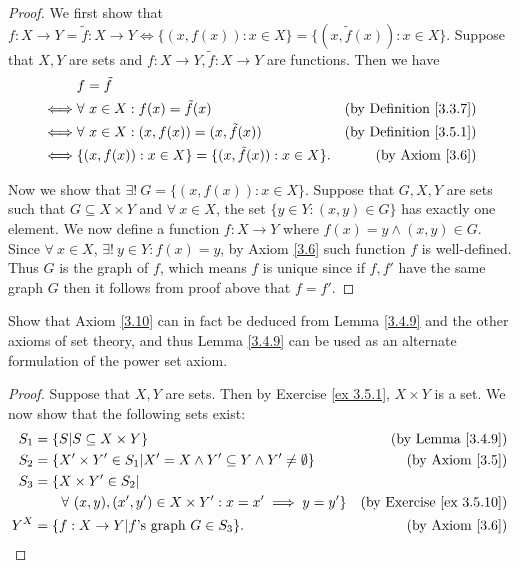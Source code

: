 \begin{proof}
    We first show that \(f : X \to Y = \tilde{f} : X \to Y \iff \{(x, f(x)) : x \in X\} = \{(x, \tilde{f}(x)) : x \in X\}\).
    Suppose that \(X, Y\) are sets and \(f : X \to Y, \tilde{f} : X \to Y\) are functions.
    Then we have
    \begin{align*}
             & f = \tilde{f}                                                                                   \\
        \iff & \forall\ x \in X : f(x) = \tilde{f}(x)                     & \text{(by Definition \ref{3.3.7})} \\
        \iff & \forall\ x \in X : (x, f(x)) = (x, \tilde{f}(x))           & \text{(by Definition \ref{3.5.1})} \\
        \iff & \{(x, f(x)) : x \in X\} = \{(x, \tilde{f}(x)) : x \in X\}. & \text{(by Axiom \ref{3.6})}
    \end{align*}

    Now we show that \(\exists!\ G = \{(x, f(x)) : x \in X\}\).
    Suppose that \(G, X, Y\) are sets such that \(G \subseteq X \times Y\) and \(\forall\ x \in X\), the set \(\{y \in Y : (x, y) \in G\}\) has exactly one element.
    We now define a function \(f : X \to Y\) where \(f(x) = y \land (x, y) \in G\).
    Since \(\forall\ x \in X\), \(\exists!\ y \in Y : f(x) = y\), by Axiom \ref{3.6} such function \(f\) is well-defined.
    Thus \(G\) is the graph of \(f\), which means \(f\) is unique since if \(f, f'\) have the same graph \(G\) then it follows from proof above that \(f = f'\).
\end{proof}

\begin{exercise}\label{ex 3.5.11}
    Show that Axiom \ref{3.10} can in fact be deduced from Lemma \ref{3.4.9} and the other axioms of set theory, and thus Lemma \ref{3.4.9} can be used as an alternate formulation of the power set axiom.
\end{exercise}

\begin{proof}
    Suppose that \(X, Y\) are sets.
    Then by Exercise \ref{ex 3.5.1}, \(X \times Y\) is a set.
    We now show that the following sets exist:
    \begin{align*}
        S_1 & = \{S | S \subseteq X \times Y\}                                                 & \text{(by Lemma \ref{3.4.9})}        \\
        S_2 & = \{X' \times Y' \in S_1 | X' = X \land Y' \subseteq Y \land Y' \neq \emptyset\} & \text{(by Axiom \ref{3.5})}          \\
        S_3 & = \{X \times Y' \in S_2 |                                                                                               \\
            & \quad\quad \forall\ (x, y), (x', y') \in X \times Y' : x = x' \implies y = y'\}  & \text{(by Exercise \ref{ex 3.5.10})} \\
        Y^X & = \{f : X \to Y | f \text{'s graph } G \in S_3\}.                                & \text{(by Axiom \ref{3.6})}
    \end{align*}
\end{proof}

